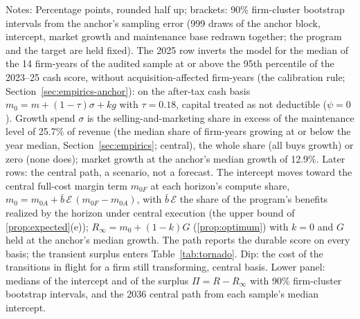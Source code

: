 \begin{table}[t]
\par\vspace{2pt}\footnotesize\raggedright Notes: Percentage points, rounded half up; brackets: 90\% firm-cluster bootstrap intervals from the anchor's sampling error (999 draws of the anchor block, intercept, market growth and maintenance base redrawn together; the program and the target are held fixed). The 2025 row inverts the model for the median of the 14 firm-years of the audited sample at or above the 95th percentile of the 2023--25 cash score, without acquisition-affected firm-years (the calibration rule; Section~\ref{sec:empirics-anchor}): on the after-tax cash basis $m_0=m+(1-\tau)\sigma+kg$ with $\tau=0.18$, capital treated as not deductible ($\psi=0$). Growth spend $\sigma$ is the selling-and-marketing share in excess of the maintenance level of 25.7\% of revenue (the median share of firm-years growing at or below the year median, Section~\ref{sec:empirics}; central), the whole share (all buys growth) or zero (none does); market growth at the anchor's median growth of 12.9\%. Later rows: the central path, a scenario, not a forecast. The intercept moves toward the central full-cost margin term $m_{0F}$ at each horizon's compute share, $m_0=m_{0A}+\bar b\,\mathcal E\,(m_{0F}-m_{0A})$, with $\bar b\,\mathcal E$ the share of the program's benefits realized by the horizon under central execution (the upper bound of \autoref{prop:expected}(e)); $R_\infty=m_0+(1-k)G$ (\autoref{prop:optimum}) with $k=0$ and $G$ held at the anchor's median growth. The path reports the durable score on every basis; the transient surplus enters Table~\ref{tab:tornado}. Dip: the cost of the transitions in flight for a firm still transforming, central basis. Lower panel: medians of the intercept and of the surplus $\Pi=R-R_\infty$ with 90\% firm-cluster bootstrap intervals, and the 2036 central path from each sample's median intercept.
\end{table}